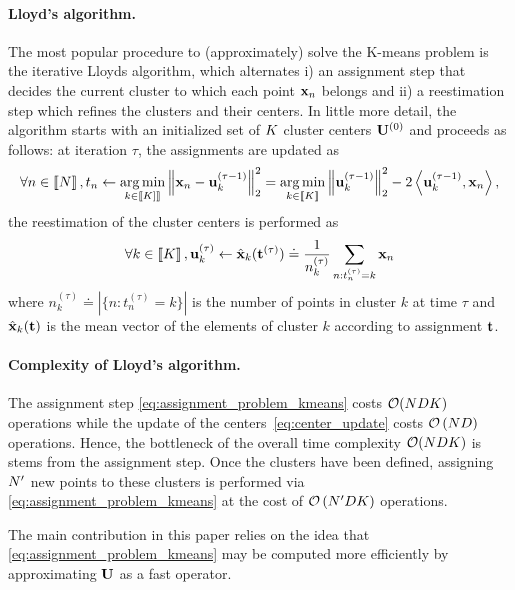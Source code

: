 \paragraph{Lloyd's algorithm.} The most popular procedure to (approximately) 
solve the K-means problem is the iterative Lloyds algorithm, which alternates
i) an assignment step that decides the current cluster to which each point ${\mathbf{x}}_n$
belongs and ii) a reestimation step which refines the clusters and their centers.
In little more detail, the algorithm starts with an initialized set of $K$
 cluster centers ${\mathbf{U}}^{(0)}$ and proceeds as follows: at iteration $\tau$,
  the assignments are updated as
\begin{align}
\label{eq:assignment_problem_kmeans}
\forall n\in\left \llbracket N\right \rrbracket, t_n \leftarrow \operatorname*{arg\,min}_{k \in \left \llbracket K]\right \rrbracket} \left\|{\mathbf{x}}_{n} - {\mathbf{u}}_{k}^{(\tau-1)}\right\|_2^2 = \operatorname*{arg\,min}_{k \in \left \llbracket K\right \rrbracket} \left\|{\mathbf{u}}_{k}^{(\tau-1)}\right\|_2^2 - 2 \left\langle{\mathbf{u}}_{k}^{(\tau-1)}, {\mathbf{x}}_{n}\right\rangle,
\end{align}
 the reestimation of the cluster centers is performed as
\begin{align}
\label{eq:center_update}
\forall k\in\left \llbracket K\right \rrbracket, {\mathbf{u}}^{(\tau)}_k \leftarrow \hat{{\mathbf{x}}}_k({\mathbf{t}}^{(\tau)})\doteq\frac{1}{n_k^{(\tau)}} \sum_{n: t^{(\tau)}_n= k} {{\mathbf{x}}_{n}}
\end{align}
where $n_k^{(\tau)}\doteq |\{n: t^{(\tau)}_n=k\}|$ is the number of points in cluster $k$
at time $\tau$ and $\hat{{\mathbf{x}}}_k({\mathbf{t}})$ is the mean vector of the elements of cluster $k$ according to assignment ${\mathbf{t}}$. %

\paragraph{Complexity of Lloyd's algorithm.} The assignment step \eqref{eq:assignment_problem_kmeans} costs $\mathcal{O}(NDK)$ operations while the update of the centers~\eqref{eq:center_update} costs $\mathcal{O}\left (ND\right )$ operations. Hence, the bottleneck of the overall time complexity $\mathcal{O}(NDK)$ is stems from the assignment step. Once the clusters have been defined, assigning $N'$ new points to these clusters is performed via \eqref{eq:assignment_problem_kmeans} at the cost of $\mathcal{O}\left (N'DK \right )$ operations.

The main contribution in this paper relies on the idea that \eqref{eq:assignment_problem_kmeans} may be computed more efficiently by approximating ${\mathbf{U}}$ as a fast operator.

